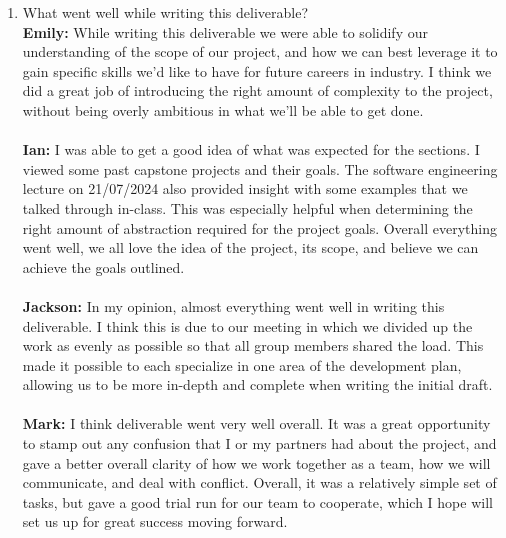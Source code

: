 \documentclass{article}
\begin{document}



\begin{enumerate}
    \item What went well while writing this deliverable? \\
    \textbf{Emily:} While writing this deliverable we were able to solidify our understanding of the scope of our project, and how we can best leverage it to 
                    gain specific skills we’d like to have for future careers in industry. I think we did a great job of introducing the right amount of 
                    complexity to the project, without being overly ambitious in what we’ll be able to get done.\\ \\
    \textbf{Ian:} I was able to get a good idea of what was expected for the sections. I viewed some past capstone projects and their goals. The software engineering 
                    lecture on 21/07/2024 also provided insight with some examples that we talked through in-class. This was especially helpful when determining the right amount of 
                    abstraction required for the project goals. Overall everything went well, we all love the idea of the project, its scope, and believe we can achieve the goals outlined.\\ \\
    \textbf{Jackson:} In my opinion, almost everything went well in writing this deliverable. I think this is due to our meeting in which we divided up the work 
                    as evenly as possible so that all group members shared the load. This made it possible to each specialize in one area of the development plan, allowing us to 
                    be more in-depth and complete when writing the initial draft.\\ \\
    \textbf{Mark:} I think deliverable went very well overall. It was a great opportunity to stamp out any confusion that I or my partners had about the project, and gave a better overall clarity
                   of how we work together as a team, how we will communicate, and deal with conflict. Overall, it was a relatively simple set of tasks, but gave a good trial run for our team to cooperate, 
                   which I hope will set us up for great success moving forward.\\ \\


\end{enumerate}
\end{document}
